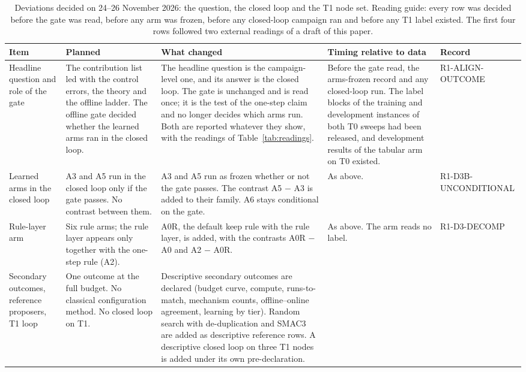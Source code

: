 \begin{table}[t]
\caption{Deviations decided on 24--26 November 2026: the question, the closed loop and the T1 node set. Reading guide: every row was decided before the gate was read, before any arm was frozen, before any closed-loop campaign ran and before any T1 label existed. The first four rows followed two external readings of a draft of this paper.}
\label{tab:dev-nov}
\footnotesize
\setlength{\tabcolsep}{3pt}
\begin{tabular}{L{0.8in}L{1.3in}L{1.9in}L{1.25in}L{0.98in}}
\toprule
Item & Planned & What changed & Timing relative to data & Record \\
\midrule
Headline question and role of the gate &
The contribution list led with the control errors, the theory and the offline ladder. The offline gate decided whether the learned arms ran in the closed loop. &
The headline question is the campaign-level one, and its answer is the closed loop. The gate is unchanged and is read once; it is the test of the one-step claim and no longer decides which arms run. Both are reported whatever they show, with the readings of Table~\ref{tab:readings}. &
Before the gate read, the arms-frozen record and any closed-loop run. The label blocks of the training and development instances of both T0 sweeps had been released, and development results of the tabular arm on T0 existed. &
R1-ALIGN-OUTCOME \\
\addlinespace
Learned arms in the closed loop &
A3 and A5 run in the closed loop only if the gate passes. No contrast between them. &
A3 and A5 run as frozen whether or not the gate passes. The contrast A5 $-$ A3 is added to their family. A6 stays conditional on the gate. &
As above. &
R1-D3B-UNCONDITIONAL \\
\addlinespace
Rule-layer arm &
Six rule arms; the rule layer appears only together with the one-step rule (A2). &
A0R, the default keep rule with the rule layer, is added, with the contrasts A0R $-$ A0 and A2 $-$ A0R. &
As above. The arm reads no label. &
R1-D3-DECOMP \\
\addlinespace
Secondary outcomes, reference proposers, T1 loop &
One outcome at the full budget. No classical configuration method. No closed loop on T1. &
Descriptive secondary outcomes are declared (budget curve, compute, runs-to-match, mechanism counts, offline--online agreement, learning by tier). Random search with de-duplication and SMAC3 are added as descriptive reference rows. A descriptive closed loop on three T1 nodes is added under its own pre-declaration. &

\end{tabular}
\end{table}
